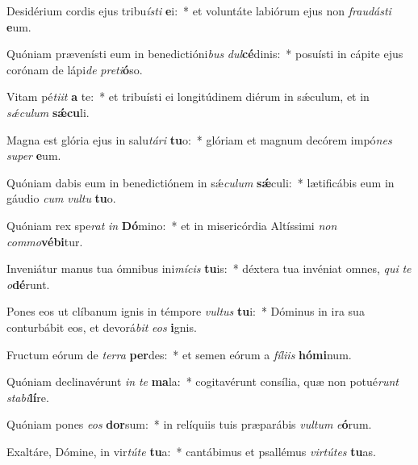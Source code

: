 \item Desidérium cordis ejus tribu\textit{ís}\textit{ti} \textbf{e}i:~* et voluntáte labiórum ejus non \textit{frau}\textit{dás}\textit{ti} \textbf{e}um.
\item Quóniam prævenísti eum in benedictióni\textit{bus} \textit{dul}\textbf{cé}dinis:~* posuísti in cápite ejus corónam de lápi\textit{de} \textit{pre}\textit{ti}\textbf{ó}so.
\item Vitam pé\textit{ti}\textit{it} \textbf{a} te:~* et tribuísti ei longitúdinem diérum in sǽculum, et in \textit{sǽ}\textit{cu}\textit{lum} \textbf{sǽ}\textbf{cu}li.
\item Magna est glória ejus in salu\textit{tá}\textit{ri} \textbf{tu}o:~* glóriam et magnum decórem impó\textit{nes} \textit{su}\textit{per} \textbf{e}um.
\item Quóniam dabis eum in benedictiónem in sǽ\textit{cu}\textit{lum} \textbf{sǽ}culi:~* lætificábis eum in gáudio \textit{cum} \textit{vul}\textit{tu} \textbf{tu}o.
\item Quóniam rex spe\textit{rat} \textit{in} \textbf{Dó}mino:~* et in misericórdia Altíssimi \textit{non} \textit{com}\textit{mo}\textbf{vé}\textbf{bi}tur.
\item Inveniátur manus tua ómnibus ini\textit{mí}\textit{cis} \textbf{tu}is:~* déxtera tua invéniat omnes, \textit{qui} \textit{te} \textit{o}\textbf{dé}runt.
\item Pones eos ut clíbanum ignis in témpore \textit{vul}\textit{tus} \textbf{tu}i:~* Dóminus in ira sua conturbábit eos, et devorá\textit{bit} \textit{e}\textit{os} \textbf{i}gnis.
\item Fructum eórum de \textit{ter}\textit{ra} \textbf{per}des:~* et semen eórum a \textit{fí}\textit{li}\textit{is} \textbf{hó}\textbf{mi}num.
\item Quóniam declinavérunt \textit{in} \textit{te} \textbf{ma}la:~* cogitavérunt consília, quæ non potué\textit{runt} \textit{sta}\textit{bi}\textbf{lí}re.
\item Quóniam pones \textit{e}\textit{os} \textbf{dor}sum:~* in relíquiis tuis præparábis \textit{vul}\textit{tum} \textit{e}\textbf{ó}rum.
\item Exaltáre, Dómine, in vir\textit{tú}\textit{te} \textbf{tu}a:~* cantábimus et psallémus \textit{vir}\textit{tú}\textit{tes} \textbf{tu}as.
